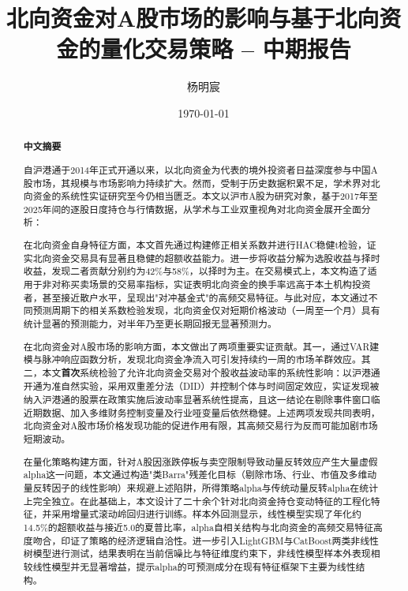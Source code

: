 \documentclass{article}
\title{北向资金对A股市场的影响与基于北向资金的量化交易策略 -- 中期报告}
\author{杨明宸}
\date{\today}
\begin{document}
\maketitle

\tableofcontents
\newpage

\listoffigures
\newpage

\listoftables
\newpage

\begin{abstract}

\textbf{中文摘要}

自沪港通于2014年正式开通以来，以北向资金为代表的境外投资者日益深度参与中国A股市场，其规模与市场影响力持续扩大。然而，受制于历史数据积累不足，学术界对北向资金的系统性实证研究至今仍相当匮乏。本文以沪市A股为研究对象，基于2017年至2025年间的逐股日度持仓与行情数据，从学术与工业双重视角对北向资金展开全面分析：

在北向资金自身特征方面，本文首先通过构建修正相关系数并进行HAC稳健t检验，证实北向资金交易具有显著且稳健的超额收益能力。进一步将收益分解为选股收益与择时收益，发现二者贡献分别约为42\%与58\%，以择时为主。在交易模式上，本文构造了适用于非对称买卖场景的交易率指标，实证表明北向资金的换手率远高于本土机构投资者，甚至接近散户水平，呈现出"对冲基金式"的高频交易特征。与此对应，本文通过不同预测周期下的相关系数检验发现，北向资金仅对短期价格波动（一周至一个月）具有统计显著的预测能力，对半年乃至更长期回报无显著预测力。

在北向资金对A股市场的影响方面，本文做出了两项重要实证贡献。其一，通过VAR建模与脉冲响应函数分析，发现北向资金净流入可引发持续约一周的市场羊群效应。其二，本文\textbf{首次}系统检验了允许北向资金交易对个股收益波动率的系统性影响：以沪港通开通为准自然实验，采用双重差分法（DID）并控制个体与时间固定效应，实证发现被纳入沪港通的股票在政策实施后波动率显著系统性提高，且这一结论在剔除事件窗口临近期数据、加入多维财务控制变量及行业哑变量后依然稳健。上述两项发现共同表明，北向资金对A股市场价格发现功能的促进作用有限，其高频交易行为反而可能加剧市场短期波动。

在量化策略构建方面，针对A股因涨跌停板与卖空限制导致动量反转效应产生大量虚假alpha这一问题，本文通过构造"类Barra"残差化目标（剔除市场、行业、市值及多维动量反转因子的线性影响）来规避上述陷阱，所得策略alpha与传统动量反转alpha在统计上完全独立。在此基础上，本文设计了二十余个针对北向资金持仓变动特征的工程化特征，并采用增量式滚动岭回归进行训练。样本外回测显示，线性模型实现了年化约14.5\%的超额收益与接近5.0的夏普比率，alpha自相关结构与北向资金的高频交易特征高度吻合，印证了策略的经济逻辑自洽性。进一步引入LightGBM与CatBoost两类非线性树模型进行测试，结果表明在当前信噪比与特征维度约束下，非线性模型样本外表现相较线性模型并无显著增益，提示alpha的可预测成分在现有特征框架下主要为线性结构。


\end{abstract}
\end{document}
